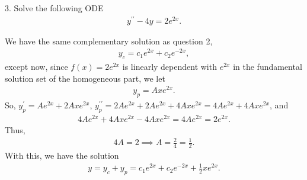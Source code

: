 \documentclass{report}
\begin{document}
    \bigbreak \noindent 
    \begin{mdframed}
        3. Solve the following ODE
        \begin{align*}
            y^{\prime\prime} - 4y = 2e^{2x}
        .\end{align*}
    \end{mdframed}
    \bigbreak \noindent 
    We have the same complementary solution as question 2,
    \begin{align*}
        y_{c} = c_{1}e^{2x} + c_{2}e^{-2x}
    ,\end{align*}
    except now, since $f(x) = 2e^{2x}$ is linearly dependent with $e^{2x}$ in the fundamental solution set of the homogeneous part, we let 
    \begin{align*}
        y_{p} = Axe^{2x}
    .\end{align*}
    So, $y_{p}^{\prime} = Ae^{2x} + 2Axe^{2x}$, $y^{\prime\prime}_{p} = 2Ae^{2x} + 2Ae^{2x} + 4Axe^{2x} = 4Ae^{2x} + 4Axe^{2x} $, and 
    \begin{align*}
        4Ae^{2x} + 4Axe^{2x} - 4Axe^{2x} = 4Ae^{2x} = 2e^{2x}        
    .\end{align*}
    Thus,
    \begin{align*}
        4A = 2 \implies A = \frac{2}{4} = \frac{1}{2}
    .\end{align*}
    With this, we have the solution
    \begin{align*}
        y = y_{c} + y_{p} = c_{1}e^{2x} + c_{2}e^{-2x} + \frac{1}{2}xe^{2x}
    .\end{align*}
\end{document}
